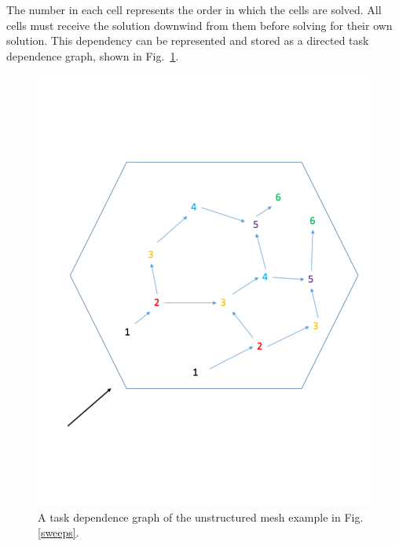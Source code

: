 \documentclass{anstrans}
\begin{document}
The number in each cell represents the order in which the cells are solved. All cells must receive the solution downwind from them before solving for their own solution. This dependency can be represented and stored as a directed task dependence graph, shown in Fig.~\ref{tdg}.

\begin{figure}
\centering
\includegraphics[scale = 0.4,trim = 0cm 3.5cm 0cm 3cm,clip]{figures/tdg.pdf}
\caption{A task dependence graph of the unstructured mesh example in Fig. \ref{sweeps}.}
\label{tdg}
\end{figure}
\end{document}

